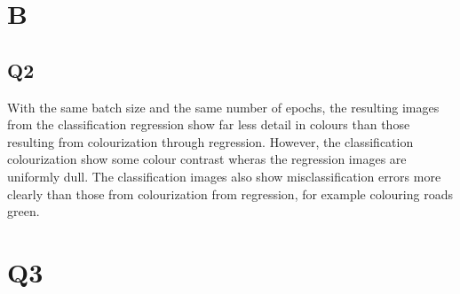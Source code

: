 \documentclass[12pt,letterpaper]{article} %
\begin{document}

\section{B}

\subsection{Q2}

With the same batch size and the same number of epochs, the resulting images from the classification regression show far less detail in colours than those resulting from colourization through regression. However, the classification colourization show some colour contrast wheras the regression images are uniformly dull. The classification images also show misclassification errors more clearly than those from colourization from regression, for example colouring roads green.

 \section{Q3}
\end{document}
